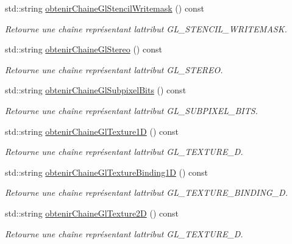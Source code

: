 \begin{DoxyCompactItemize}
std\+::string \hyperlink{group__utilitaire_ga4dbeac5dc5d9ad85a54af632e3f96aac}{obtenir\+Chaine\+Gl\+Stencil\+Writemask} () const 
\begin{DoxyCompactList}\small\item\em Retourne une chaîne représentant l\textquotesingle{}attribut G\+L\+\_\+\+S\+T\+E\+N\+C\+I\+L\+\_\+\+W\+R\+I\+T\+E\+M\+A\+S\+K. \end{DoxyCompactList}\item 
std\+::string \hyperlink{group__utilitaire_gadb2e39bc8896bcdd38587b23347df156}{obtenir\+Chaine\+Gl\+Stereo} () const 
\begin{DoxyCompactList}\small\item\em Retourne une chaîne représentant l\textquotesingle{}attribut G\+L\+\_\+\+S\+T\+E\+R\+E\+O. \end{DoxyCompactList}\item 
std\+::string \hyperlink{group__utilitaire_ga842fdba84c1a6dc5261e2e694732df1a}{obtenir\+Chaine\+Gl\+Subpixel\+Bits} () const 
\begin{DoxyCompactList}\small\item\em Retourne une chaîne représentant l\textquotesingle{}attribut G\+L\+\_\+\+S\+U\+B\+P\+I\+X\+E\+L\+\_\+\+B\+I\+T\+S. \end{DoxyCompactList}\item 
std\+::string \hyperlink{group__utilitaire_ga60712e8970d469ba28a61541933011c4}{obtenir\+Chaine\+Gl\+Texture1\+D} () const 
\begin{DoxyCompactList}\small\item\em Retourne une chaîne représentant l\textquotesingle{}attribut G\+L\+\_\+\+T\+E\+X\+T\+U\+R\+E\+\_\+D. \end{DoxyCompactList}\item 
std\+::string \hyperlink{group__utilitaire_ga6ef71bae62c28f023f69aa0838ef1b31}{obtenir\+Chaine\+Gl\+Texture\+Binding1\+D} () const 
\begin{DoxyCompactList}\small\item\em Retourne une chaîne représentant l\textquotesingle{}attribut G\+L\+\_\+\+T\+E\+X\+T\+U\+R\+E\+\_\+\+B\+I\+N\+D\+I\+N\+G\+\_\+D. \end{DoxyCompactList}\item 
std\+::string \hyperlink{group__utilitaire_ga9c4d303e8a354ddb4678796eaceb45c6}{obtenir\+Chaine\+Gl\+Texture2\+D} () const 
\begin{DoxyCompactList}\small\item\em Retourne une chaîne représentant l\textquotesingle{}attribut G\+L\+\_\+\+T\+E\+X\+T\+U\+R\+E\+\_\+D. \end{DoxyCompactList}\item 

\end{DoxyCompactItemize}
